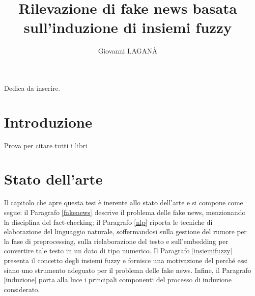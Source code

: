 \documentclass[12pt]{report}
\theoremstyle{definition}
\begin{document}
\title{Rilevazione di fake news
basata sull'induzione di insiemi fuzzy}
\author{Giovanni LAGANÀ}
%
%
%
\beforepreface
        {\hfill \Large {\sl \begin{flushright} Dedica da inserire.         
\end{flushright}         }}
%
%
%
%
\afterpreface

%
%

\chapter*{Introduzione}
  
\onehalfspacing

Prova per citare tutti i libri
\cite{1,2,3,4,5,6,7,8,9,10,11,12,13,14,15,16,17,18,19,20,21,22}


\chapter{Stato dell'arte}
\label{Capitolo 1}
\onehalfspacing

Il capitolo che apre questa tesi è inerente allo stato dell'arte e si compone come segue: il Paragrafo \ref{fakenews} descrive il problema delle fake news, menzionando la disciplina del fact-checking; il Paragrafo \ref{nlp} riporta le tecniche di elaborazione del linguaggio naturale, soffermandosi sulla gestione del rumore per la fase di preprocessing, sulla rielaborazione del testo e sull'embedding per convertire tale testo in un dato di tipo numerico. 
Il Paragrafo \ref{insiemifuzzy} presenta il concetto degli insiemi fuzzy e fornisce una motivazione del perché essi siano uno strumento adeguato per il problema delle fake news.
Infine, il Paragrafo \ref{induzione} porta alla luce i principali componenti del processo di induzione considerato.
\end{document}
